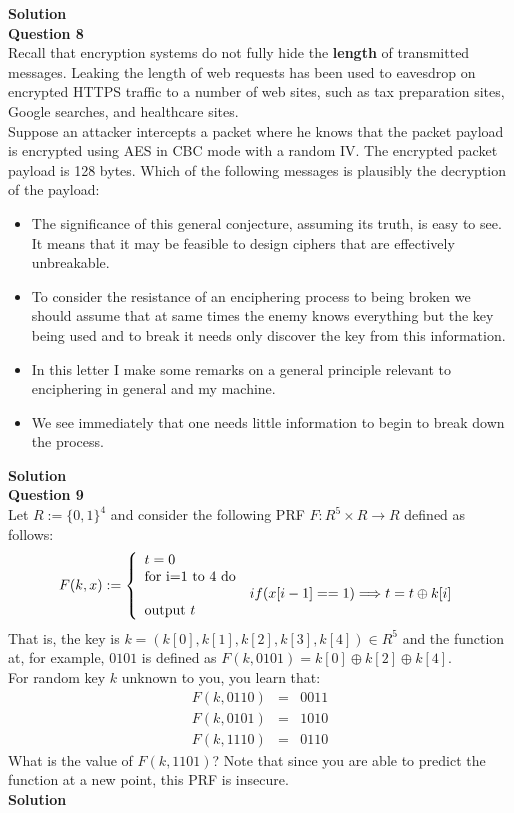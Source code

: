\documentclass[a4paper,12pt]{article}
\begin{document}
\textbf{Solution}\\

\textbf{Question 8}\\

Recall that encryption systems do not fully hide the \textbf{length} of transmitted messages. Leaking the length of web requests has been used to eavesdrop on encrypted HTTPS traffic to a number of web sites, such as tax preparation sites, Google searches, and healthcare sites.\\

Suppose an attacker intercepts a packet where he knows that the packet payload is encrypted using AES in CBC mode with a random IV. The encrypted packet payload is 128 bytes. Which of the following messages is plausibly the decryption of the payload:
%
\begin{itemize}
\item The significance of this general conjecture, assuming its truth, is easy to see. It means that it may be feasible to design ciphers that are effectively unbreakable.
\item To consider the resistance of an enciphering process to being broken we should assume that at same times the enemy knows everything but the key being used and to break it needs only discover the key from this information.
\item In this letter I make some remarks on a general principle relevant to enciphering in general and my machine.
\item We see immediately that one needs little information to begin to break down the process.
\end{itemize}

\textbf{Solution}\\

\textbf{Question 9} \\

Let $R:= \{0,1\}^{4}$ and consider the following PRF $F:R^{5}\times R \rightarrow R$ defined as follows:
%
\begin{equation*}
F(k, x):=\left\{\begin{array}{l l}
t = 0 & \\
\textrm{for i=1 to 4 do} & \\
 & if (x[i-1]==1) \Longrightarrow t = t\oplus k[i] \\
\textrm{output } t &
\end{array}
\right.  
\end{equation*}
%
That is, the key is $k=(k[0],k[1],k[2],k[3],k[4])\in R^{5}$ and the function at, for example, $0101$ is defined as $F(k,0101) = k[0]\oplus k[2]\oplus k[4]$.\\

For random key $k$ unknown to you, you learn that:
%
\begin{eqnarray*}
F(k,0110) & = & 0011\\
F(k,0101) & = & 1010\\
F(k,1110) & = & 0110
\end{eqnarray*}
%
What is the value of $F(k,1101)$? Note that since you are able to predict the function at a new point, this PRF is insecure.\\

\textbf{Solution} \\
\end{document}
